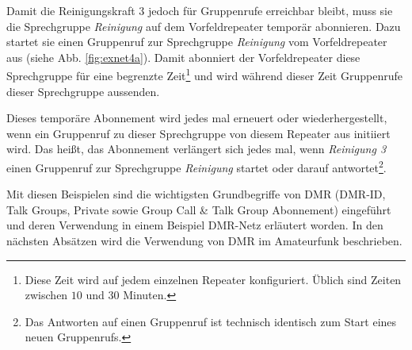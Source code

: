 Damit die Reinigungskraft 3 jedoch für Gruppenrufe erreichbar bleibt, muss sie die Sprechgruppe \emph{Reinigung} auf dem Vorfeldrepeater temporär abonnieren. Dazu startet sie einen Gruppenruf zur Sprechgruppe \emph{Reinigung} vom Vorfeldrepeater aus (siehe Abb. \ref{fig:exnet4a}). Damit abonniert der Vorfeldrepeater diese Sprechgruppe für eine begrenzte Zeit\footnote{Diese Zeit wird auf jedem einzelnen Repeater konfiguriert. Üblich sind Zeiten zwischen $10$ und $30$ Minuten.} und wird während dieser Zeit Gruppenrufe dieser Sprechgruppe aussenden. 

Dieses temporäre Abonnement wird jedes mal erneuert oder wiederhergestellt, wenn ein Gruppenruf zu dieser Sprechgruppe von diesem Repeater aus initiiert wird. Das heißt, das Abonnement verlängert sich jedes mal, wenn \emph{Reinigung 3} einen Gruppenruf zur Sprechgruppe \emph{Reinigung} startet oder darauf antwortet\footnote{Das Antworten auf einen Gruppenruf ist technisch identisch zum Start eines neuen Gruppenrufs.}.

Mit diesen Beispielen sind die wichtigsten Grundbegriffe von DMR (DMR-ID, Talk Groups, Private sowie Group Call \& Talk Group Abonnement) eingeführt und deren Verwendung in einem Beispiel DMR-Netz erläutert worden. In den nächsten Absätzen wird die Verwendung von DMR im Amateurfunk beschrieben.

